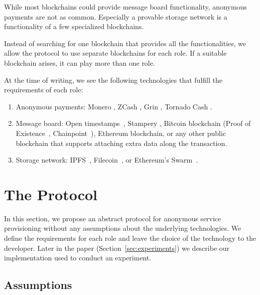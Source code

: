 \documentclass[pdftex,twocolumn,epjc3]{svjour3}
\begin{document}
{While most blockchains could provide message board functionality, anonymous payments are not as common. Especially a provable storage network is a functionality of a few specialized blockchains.

Instead of searching for one blockchain that provides all the functionalities, we allow the protocol to use separate blockchains for each role. If a suitable blockchain arises, it can play more than one role.

At the time of writing, we see the following technologies that fulfill the requirements of each role:

\begin{enumerate}
\def\labelenumi{\arabic{enumi}.}

\item Anonymous payments: Monero \cite{vansaberhagenCryptoNote2013}, ZCash
  \cite{ben-sassonZerocashDecentralizedAnonymous2014}, Grin \cite{fuchsbauerAggregateCashSystems2019},
  Tornado Cash \cite{pertsevTornadoCashPrivacy2019}.
\item Message board: Open timestamps~\cite{opentimestampsTimestampingProofStandard}, Stampery \cite{crespoStamperyBlockchainTimestamping2017}, Bitcoin blockchain (Proof of Existence~\cite{proofofexistenceWebApplicationProve}, Chainpoint~\cite{chainpointBlockchainProofAnchoring}), Ethereum blockchain, or any other public blockchain that supports attaching extra data along the transaction.
\item Storage network: IPFS~\cite{benetIPFSContentAddressed2014}, Filecoin~\cite{protocollabsFilecoinDecentralizedStorage2017}, or Ethereum's
  Swarm~\cite{teamSWARMStorageCommunication2021}.
\end{enumerate}

\section{The Protocol}\label{sec:protocol}
In this section, we propose an abstract protocol for anonymous service provisioning without any assumptions about the underlying technologies. We define the requirements for each role and leave the choice of the technology to the developer. Later in the paper (Section~\ref{sec:experiments}) we describe our implementation used to conduct an experiment.

\subsection{Assumptions}

}
\end{document}
